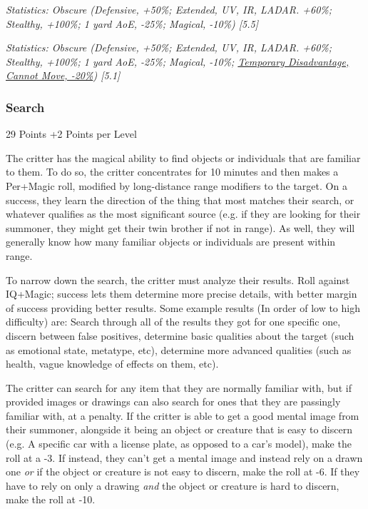 \begin{multicols*}{3}
	
	\textcolor{OliveGreen}{\textit{Statistics: Obscure (Defensive, +50\%; Extended, UV, IR, LADAR. +60\%; Stealthy, +100\%; 1 yard AoE, -25\%; Magical, -10\%) [5.5] }}
	
	\textcolor{OliveGreen}{\textit{Statistics: Obscure (Defensive, +50\%; Extended, UV, IR, LADAR. +60\%; Stealthy, +100\%; 1 yard AoE, -25\%; Magical, -10\%; \href{http://forums.sjgames.com/showpost.php?p=322574&postcount=8}{Temporary Disadvantage, Cannot Move, -20\%}) [5.1] }}
	
	\subsubsection{Search}\label{search}
	\begin{flushright}
		29 Points +2 Points per Level
	\end{flushright}
	
	The critter has the magical ability to find objects or individuals that are familiar to them. To do so, the critter concentrates for 10 minutes and then makes a Per+Magic roll, modified by long-distance range modifiers to the target. On a success, they learn the direction of the thing that most matches their search, or whatever qualifies as the most significant source (e.g. if they are looking for their summoner, they might get their twin brother if not in range). As well, they will generally know how many familiar objects or individuals are present within range. 
	
	To narrow down the search, the critter must analyze their results. Roll against IQ+Magic; success lets them determine more precise details, with better margin of success providing better results. Some example results (In order of low to high difficulty) are: Search through all of the results they got for one specific one, discern between false positives, determine basic qualities about the target (such as emotional state, metatype, etc), determine more advanced qualities (such as health, vague knowledge of effects on them, etc).
	
	The critter can search for any item that they are normally familiar with, but if provided images or drawings can also search for ones that they are passingly familiar with, at a penalty. If the critter is able to get a good mental image from their summoner, alongside it being an object or creature that is easy to discern (e.g. A specific car with a license plate, as opposed to a car's model), make the roll at a -3. If instead, they can't get a mental image and instead rely on a drawn one \textit{or} if the object or creature is not easy to discern, make the roll at -6. If they have to rely on only a drawing \textit{and} the object or creature is hard to discern, make the roll at -10.
	

\end{multicols*}
